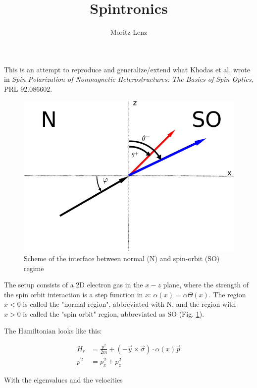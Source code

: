 \documentclass[11pt]{article}
\author{Moritz Lenz}
\title{Spintronics}
\begin{document}
\maketitle

This is an attempt to reproduce and generalize/extend what Khodas et
al. wrote in {\em Spin 
Polarization of Nonmagnetic Heterostructures: The Basics of Spin
Optics}, PRL 92.086602.

\begin{figure}
    \begin{center}
        \includegraphics{setup-simple.pdf}
    \end{center}
    \caption{Scheme of the interface between normal (N)
            and spin-orbit (SO) regime}
    \label{fig:setup-zero}
\end{figure}

The setup consists of a 2D electron gas in the $x-z$ plane, where the
strength of the spin orbit interaction is a step function in $x$:
$\alpha(x) = \alpha \Theta(x)$. The region $x < 0$ is called the
"normal region", abbreviated with N, and the region with $x > 0$ is
called the "spin orbit" region, abbreviated as SO (Fig.
\ref{fig:setup-zero}).


The Hamiltonian looks like this:

\begin{align}
    H_r &= \frac{p^2}{2m} + (-\vec y \times \vec \sigma) \cdot
            \alpha(x) \vec p\\ 
    p^2 &= p_x^2 + p_z^2
\end{align}

With the eigenvalues and the velocities
\end{document}
